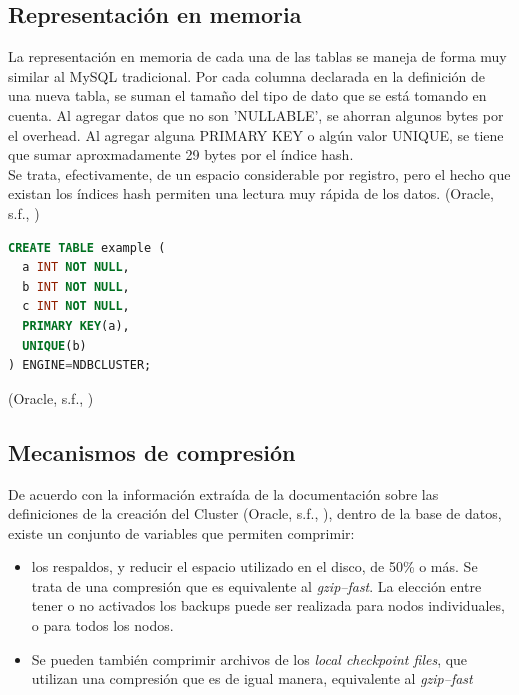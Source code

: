 \documentclass{acmart}
\begin{document}
\subsection{Representación en memoria}
La representación en memoria de cada una de las tablas se maneja de forma muy similar al MySQL tradicional. Por cada columna declarada en la definición de una nueva tabla, se suman el tamaño del tipo de dato que se está tomando en cuenta. Al agregar datos que no son 'NULLABLE', se ahorran algunos bytes por el overhead. Al agregar alguna PRIMARY KEY o algún valor UNIQUE, se tiene que sumar aproxmadamente 29 bytes por el índice hash.\\
Se trata, efectivamente, de un espacio considerable por registro, pero el hecho que existan los índices hash permiten una lectura muy rápida de los datos. (Oracle, s.f., \cite{mysqlcomp})

\begin{lstlisting}[language=sql]
    CREATE TABLE example (
  a INT NOT NULL,
  b INT NOT NULL,
  c INT NOT NULL,
  PRIMARY KEY(a),
  UNIQUE(b)
) ENGINE=NDBCLUSTER;
\end{lstlisting}
(Oracle, s.f., \cite{mysqlcomp})

\subsection{Mecanismos de compresión}
De acuerdo con la información extraída de la documentación sobre las definiciones de la creación del Cluster (Oracle, s.f., \cite{mysqlcomp}), dentro de la base de datos, existe un conjunto de variables que permiten comprimir:
\begin{itemize}
    \item los respaldos, y reducir el espacio utilizado en el disco, de 50\% o más. Se trata de una compresión que es equivalente al \textit{gzip--fast}. La elección entre tener o no activados los backups puede ser realizada para nodos individuales, o para todos los nodos.
    \item Se pueden también comprimir archivos de los \textit{local checkpoint files}, que utilizan una compresión que es de igual manera, equivalente al \textit{gzip--fast}
\end{itemize}
\end{document}
